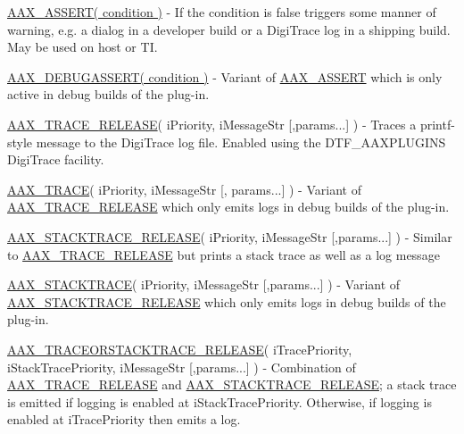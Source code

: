 \begin{DoxyItemize}
\item \hyperlink{a00158_a168ee44fd7a5485ab50160db36fb2988}{A\+A\+X\+\_\+\+A\+S\+S\+E\+R\+T( condition )} -\/ If the condition is {\ttfamily false} triggers some manner of warning, e.\+g. a dialog in a developer build or a Digi\+Trace log in a shipping build. May be used on host or T\+I.
\item \hyperlink{a00158_aa0253bd2994036fcfd6629ecf465d543}{A\+A\+X\+\_\+\+D\+E\+B\+U\+G\+A\+S\+S\+E\+R\+T( condition )} -\/ Variant of \hyperlink{a00158_a168ee44fd7a5485ab50160db36fb2988}{A\+A\+X\+\_\+\+A\+S\+S\+E\+R\+T} which is only active in debug builds of the plug-\/in.
\item \hyperlink{a00158_ac2aa820ece56bb59140ad561218db4b3}{A\+A\+X\+\_\+\+T\+R\+A\+C\+E\+\_\+\+R\+E\+L\+E\+A\+S\+E}( i\+Priority, i\+Message\+Str \mbox{[},params...\mbox{]} ) -\/ Traces a printf-\/ style message to the Digi\+Trace log file. Enabled using the {\ttfamily D\+T\+F\+\_\+\+A\+A\+X\+P\+L\+U\+G\+I\+N\+S} Digi\+Trace facility.
\item \hyperlink{a00158_ab53f1d6a94f8b6ebb3a101f71bfe4e82}{A\+A\+X\+\_\+\+T\+R\+A\+C\+E}( i\+Priority, i\+Message\+Str \mbox{[}, params...\mbox{]} ) -\/ Variant of \hyperlink{a00158_ac2aa820ece56bb59140ad561218db4b3}{A\+A\+X\+\_\+\+T\+R\+A\+C\+E\+\_\+\+R\+E\+L\+E\+A\+S\+E} which only emits logs in debug builds of the plug-\/in.
\item \hyperlink{a00158_a51f7dcc4ce960ab8855ec97f031a1463}{A\+A\+X\+\_\+\+S\+T\+A\+C\+K\+T\+R\+A\+C\+E\+\_\+\+R\+E\+L\+E\+A\+S\+E}( i\+Priority, i\+Message\+Str \mbox{[},params...\mbox{]} ) -\/ Similar to \hyperlink{a00158_ac2aa820ece56bb59140ad561218db4b3}{A\+A\+X\+\_\+\+T\+R\+A\+C\+E\+\_\+\+R\+E\+L\+E\+A\+S\+E} but prints a stack trace as well as a log message
\item \hyperlink{a00158_ae871829dd7297e4a5ae6c7094f6b5398}{A\+A\+X\+\_\+\+S\+T\+A\+C\+K\+T\+R\+A\+C\+E}( i\+Priority, i\+Message\+Str \mbox{[},params...\mbox{]} ) -\/ Variant of \hyperlink{a00158_a51f7dcc4ce960ab8855ec97f031a1463}{A\+A\+X\+\_\+\+S\+T\+A\+C\+K\+T\+R\+A\+C\+E\+\_\+\+R\+E\+L\+E\+A\+S\+E} which only emits logs in debug builds of the plug-\/in.
\item \hyperlink{a00158_a74f610a8e4359a5fc3eae89be3eb3a4b}{A\+A\+X\+\_\+\+T\+R\+A\+C\+E\+O\+R\+S\+T\+A\+C\+K\+T\+R\+A\+C\+E\+\_\+\+R\+E\+L\+E\+A\+S\+E}( i\+Trace\+Priority, i\+Stack\+Trace\+Priority, i\+Message\+Str \mbox{[},params...\mbox{]} ) -\/ Combination of \hyperlink{a00158_ac2aa820ece56bb59140ad561218db4b3}{A\+A\+X\+\_\+\+T\+R\+A\+C\+E\+\_\+\+R\+E\+L\+E\+A\+S\+E} and \hyperlink{a00158_a51f7dcc4ce960ab8855ec97f031a1463}{A\+A\+X\+\_\+\+S\+T\+A\+C\+K\+T\+R\+A\+C\+E\+\_\+\+R\+E\+L\+E\+A\+S\+E}; a stack trace is emitted if logging is enabled at {\ttfamily i\+Stack\+Trace\+Priority}. Otherwise, if logging is enabled at {\ttfamily i\+Trace\+Priority} then emits a log.
\end{DoxyItemize}

